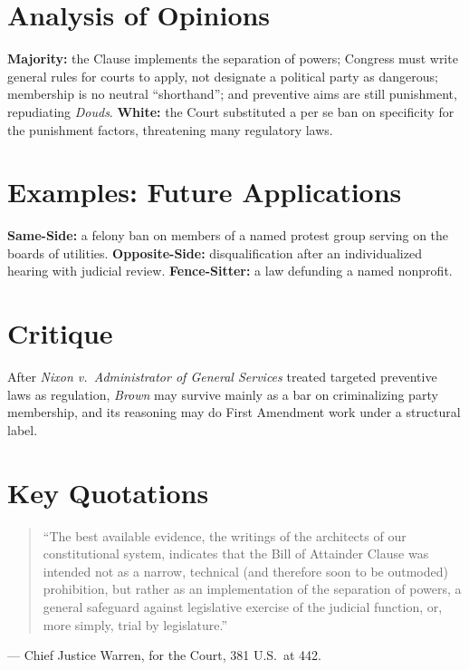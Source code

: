\documentclass[12pt]{article}
\begin{document}
\section{Analysis of Opinions}
\textbf{Majority:} the Clause implements the separation of powers; Congress must write general rules for courts to apply, not designate a political party as dangerous; membership is no neutral ``shorthand''; and preventive aims are still punishment, repudiating \textit{Douds}. \textbf{White:} the Court substituted a per se ban on specificity for the punishment factors, threatening many regulatory laws.

\section{Examples: Future Applications}
\textbf{Same-Side:} a felony ban on members of a named protest group serving on the boards of utilities. \textbf{Opposite-Side:} disqualification after an individualized hearing with judicial review. \textbf{Fence-Sitter:} a law defunding a named nonprofit.

\section{Critique}
After \textit{Nixon v.\ Administrator of General Services} treated targeted preventive laws as regulation, \textit{Brown} may survive mainly as a bar on criminalizing party membership, and its reasoning may do First Amendment work under a structural label.

\section{Key Quotations}
\begin{quote}
``The best available evidence, the writings of the architects of our constitutional system, indicates that the Bill of Attainder Clause was intended not as a narrow, technical (and therefore soon to be outmoded) prohibition, but rather as an implementation of the separation of powers, a general safeguard against legislative exercise of the judicial function, or, more simply, trial by legislature.''
\end{quote}
\noindent --- Chief Justice Warren, for the Court, 381 U.S.\ at 442.
\end{document}
